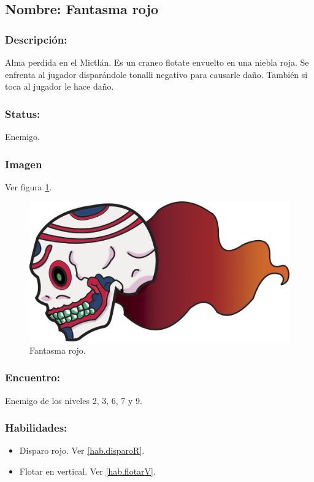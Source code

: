 \documentclass[11pt,letterpaper]{article}
\begin{document}
\subsection{Nombre: Fantasma rojo}   \label{per.fantasmaR}
\subsubsection{Descripción:}
Alma perdida en el Mictlán. Es un craneo flotate envuelto en una niebla roja.
Se enfrenta al jugador disparándole tonalli negativo para causarle daño. También si toca al jugador le hace daño. 
\subsubsection{Status:}
Enemigo.
\subsubsection{Imagen}
Ver figura \ref{fig:fantasmaR}.
\begin{figure}
	\centering
	\includegraphics[height=0.2 \textheight]{Imagenes/fantasmaRojo}
	\caption{Fantasma rojo.}
	\label{fig:fantasmaR}
\end{figure} 
\subsubsection{Encuentro:}
Enemigo de los niveles 2, 3, 6, 7 y 9.
\subsubsection{Habilidades:}
\begin{itemize}
	\item Disparo rojo. Ver \ref{hab.disparoR}.
	\item Flotar en vertical. Ver \ref{hab.flotarV}.
\end{itemize}
\end{document}
